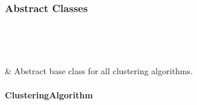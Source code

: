\documentclass[letterpaper,10pt,english]{sphinxmanual}
\begin{document}
\subsubsection{Abstract Classes}
\label{\detokenize{api/directional_clustering.clustering:abstract-classes}}

\begin{savenotes}\sphinxatlongtablestart\begin{longtable}[c]{}
\hline

\endfirsthead

%
{}\\
\hline

\endhead

\hline
{}\\
\endfoot

\endlastfoot

{\hyperref[\detokenize{api/generated/directional_clustering.clustering.ClusteringAlgorithm:directional_clustering.clustering.ClusteringAlgorithm}]{}}
&
Abstract base class for all clustering algorithms.
\\
\hline
\end{longtable}\sphinxatlongtableend\end{savenotes}


\paragraph{ClusteringAlgorithm}
\label{\detokenize{api/generated/directional_clustering.clustering.ClusteringAlgorithm:clusteringalgorithm}}\label{\detokenize{api/generated/directional_clustering.clustering.ClusteringAlgorithm::doc}}
\end{document}

